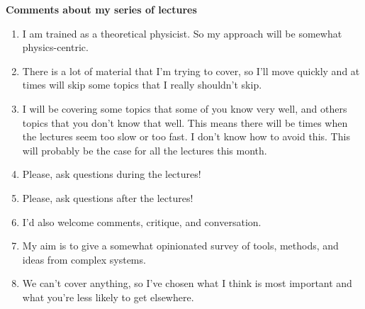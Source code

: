 \documentclass[%
  color,
  epsf,
  url,
  amssymb,
  semhelv,%
  portrait,%
  semlayer%
  ]{seminar}
\begin{document}
\begin{slide*}
\centerslidesfalse
\begin{center}
{\bf Comments about my series of lectures}
\end{center}


\begin{enumerate}

\item I am trained as a theoretical physicist.  So my approach will be
somewhat physics-centric. 

\item There is a lot of material that I'm trying to cover, so I'll
move quickly and at times will skip some topics that I really
shouldn't skip. 

\item I will be covering some topics that some of you know very well,
and others topics that you don't know that well.  This means there
will be times when the lectures seem too slow or too fast.  I don't
know how to avoid this.  This will probably be the case for all the
lectures this month.

\item Please, ask questions during the lectures!

\item Please, ask questions after the lectures!

\item I'd also welcome comments, critique, and conversation. 


\item My aim is to give a somewhat opinionated survey of tools,
methods, and ideas from complex systems.  

\item We can't cover anything, so I've chosen what I think is most
important and what you're less likely to get elsewhere. 

\end{enumerate}


\end{slide*}
\end{document}
